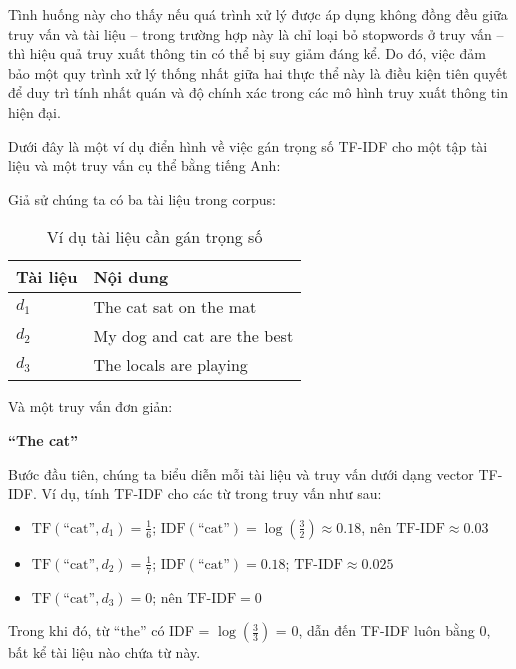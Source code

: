 Tình huống này cho thấy nếu quá trình xử lý được áp dụng không đồng đều giữa truy vấn và tài liệu -- trong trường hợp này là chỉ loại bỏ stopwords ở truy vấn -- thì hiệu quả truy xuất thông tin có thể bị suy giảm đáng kể. Do đó, việc đảm bảo một quy trình xử lý thống nhất giữa hai thực thể này là điều kiện tiên quyết để duy trì tính nhất quán và độ chính xác trong các mô hình truy xuất thông tin hiện đại.

Dưới đây là một ví dụ điển hình về việc gán trọng số TF-IDF cho một tập tài liệu và một truy vấn cụ thể bằng tiếng Anh:

Giả sử chúng ta có ba tài liệu trong corpus:

\begin{table}[H]
    \centering
    \caption{Ví dụ tài liệu cần gán trọng số}
    \begin{tabularx}{0.7\linewidth}{l || X}
        \toprule
        \textbf{Tài liệu} & \textbf{Nội dung}           \\
        \midrule\midrule
        \(d_1\)           & The cat sat on the mat      \\
        \(d_2\)           & My dog and cat are the best \\
        \(d_3\)           & The locals are playing      \\
        \bottomrule
    \end{tabularx}
\end{table}

Và một truy vấn đơn giản:

\begin{center}
    \textbf{``The cat''}
\end{center}

Bước đầu tiên, chúng ta biểu diễn mỗi tài liệu và truy vấn dưới dạng vector TF-IDF. Ví dụ, tính TF-IDF cho các từ trong truy vấn như sau:

\begin{itemize}
    \item \(\text{TF}(\text{``cat''}, d_{1}) = \frac{1}{6}\); \(\text{IDF}(\text{``cat''}) = \log\left(\frac{3}{2}\right) \approx 0.18\), nên \(\text{TF-IDF} \approx 0.03\)
    \item \(\text{TF}(\text{``cat''}, d_{2}) = \frac{1}{7}\); \(\text{IDF}(\text{``cat''}) = 0.18\); \(\text{TF-IDF} \approx 0.025\)
    \item \(\text{TF}(\text{``cat''}, d_{3}) = 0\); nên \(\text{TF-IDF} = 0\)
\end{itemize}

Trong khi đó, từ ``the'' có IDF = \(\log(\frac{3}{3})\) = 0, dẫn đến TF-IDF luôn bằng 0, bất kể tài liệu nào chứa từ này.

